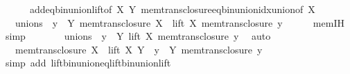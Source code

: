 \begin{isabellebody}
\ \ \ \ \ \ add{\isacharunderscore}{\kern0pt}eq{\isacharunderscore}{\kern0pt}bin{\isacharunderscore}{\kern0pt}union{\isacharunderscore}{\kern0pt}lift{\isacharbrackleft}{\kern0pt}of\ X\ Y{\isacharbrackright}{\kern0pt}\ mem{\isacharunderscore}{\kern0pt}trans{\isacharunderscore}{\kern0pt}closure{\isacharunderscore}{\kern0pt}eq{\isacharunderscore}{\kern0pt}bin{\isacharunderscore}{\kern0pt}union{\isacharunderscore}{\kern0pt}idx{\isacharunderscore}{\kern0pt}union{\isacharbrackleft}{\kern0pt}of\ X{\isacharbrackright}{\kern0pt}{\isacharparenright}{\kern0pt}\isanewline
\ \ \isamarkupfalse%
\ \isamarkupfalse%
\ {\isachardoublequoteopen}{\isachardot}{\kern0pt}{\isachardot}{\kern0pt}{\isachardot}{\kern0pt}\ {\isacharequal}{\kern0pt}\ {\isacharquery}{\kern0pt}unions\ {\isasymunion}\ {\isacharparenleft}{\kern0pt}{\isasymUnion}y\ {\isasymin}\ Y{\isachardot}{\kern0pt}\ mem{\isacharunderscore}{\kern0pt}trans{\isacharunderscore}{\kern0pt}closure\ X\ {\isasymunion}\ lift\ X\ {\isacharparenleft}{\kern0pt}mem{\isacharunderscore}{\kern0pt}trans{\isacharunderscore}{\kern0pt}closure\ y{\isacharparenright}{\kern0pt}{\isacharparenright}{\kern0pt}{\isachardoublequoteclose}\isanewline
\ \ \ \ \isamarkupfalse%
\ mem{\isachardot}{\kern0pt}IH\ \isamarkupfalse%
\ simp\isanewline
\ \ \isamarkupfalse%
\ \isamarkupfalse%
\ {\isachardoublequoteopen}{\isachardot}{\kern0pt}{\isachardot}{\kern0pt}{\isachardot}{\kern0pt}\ {\isacharequal}{\kern0pt}\ {\isacharquery}{\kern0pt}unions\ {\isasymunion}\ {\isacharparenleft}{\kern0pt}{\isasymUnion}y\ {\isasymin}\ Y{\isachardot}{\kern0pt}\ lift\ X\ {\isacharparenleft}{\kern0pt}mem{\isacharunderscore}{\kern0pt}trans{\isacharunderscore}{\kern0pt}closure\ y{\isacharparenright}{\kern0pt}{\isacharparenright}{\kern0pt}{\isachardoublequoteclose}\ \isamarkupfalse%
\ auto\isanewline
\ \ \isamarkupfalse%
\ \isamarkupfalse%
\ {\isachardoublequoteopen}{\isachardot}{\kern0pt}{\isachardot}{\kern0pt}{\isachardot}{\kern0pt}\ {\isacharequal}{\kern0pt}\ mem{\isacharunderscore}{\kern0pt}trans{\isacharunderscore}{\kern0pt}closure\ X\ {\isasymunion}\ lift\ X\ {\isacharparenleft}{\kern0pt}Y\ {\isasymunion}\ {\isacharparenleft}{\kern0pt}{\isasymUnion}y\ {\isasymin}\ Y{\isachardot}{\kern0pt}\ mem{\isacharunderscore}{\kern0pt}trans{\isacharunderscore}{\kern0pt}closure\ y{\isacharparenright}{\kern0pt}{\isacharparenright}{\kern0pt}{\isachardoublequoteclose}\isanewline
\ \ \ \ \isamarkupfalse%
\ {\isacharparenleft}{\kern0pt}simp\ add{\isacharcolon}{\kern0pt}\ lift{\isacharunderscore}{\kern0pt}bin{\isacharunderscore}{\kern0pt}union{\isacharunderscore}{\kern0pt}eq{\isacharunderscore}{\kern0pt}lift{\isacharunderscore}{\kern0pt}bin{\isacharunderscore}{\kern0pt}union{\isacharunderscore}{\kern0pt}lift\isanewline

\end{isabellebody}

